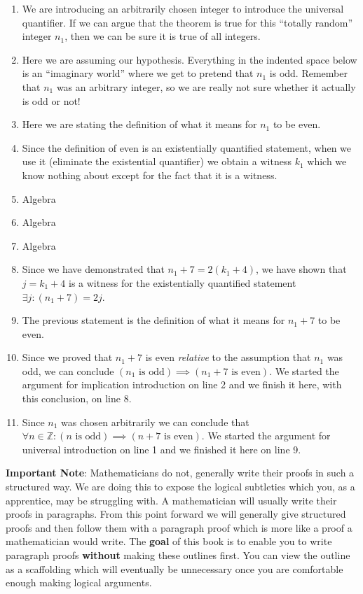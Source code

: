 \begin{example}
	\begin{enumerate}
		\item We are introducing an arbitrarily chosen integer to introduce the universal quantifier.  If we can argue that the theorem is true for this  ``totally random'' integer $n_1$, then we can be sure it is true of all integers.
		\item Here we are assuming our hypothesis.  Everything in the indented space below is an ``imaginary world'' where we get to pretend that $n_1$ is odd.  Remember that $n_1$ was an arbitrary integer, so we are really not sure whether it actually is odd or not!
		\item Here we are stating the definition of what it means for $n_1$ to be even.  \item Since the definition of even is an existentially quantified statement, when we use it (eliminate the existential quantifier) we obtain a witness $k_1$ which we know nothing about except for the fact that it is a witness.
		\item Algebra
		\item Algebra
		\item Algebra
		\item Since we have demonstrated that $n_1+7 = 2(k_1+4)$, we have shown that $j = k_1+4$ is a witness for the existentially quantified statement $\exists j : (n_1+7) = 2j $.  
		\item The previous statement is the definition of what it means for $n_1+7$ to be even.
		\item Since we proved that $n_1 + 7$ is even \textit{relative} to the assumption that $n_1$ was odd, we can conclude $(n_1 \textrm{ is odd}) \implies (n_1 + 7 \textrm{ is even})$.  We started the argument for implication introduction on line 2 and we finish it here, with this conclusion, on line 8.
		\item Since $n_1$ was chosen arbitrarily we can conclude that 	$\forall n \in \mathbb{Z}: (\textrm{$n$ is odd}) \implies (\textrm{$n+7$ is even})$.  We started the argument for universal introduction on line 1 and we finished it here on line 9.
	\end{enumerate}

\textbf{Important Note}:  Mathematicians do not, generally write their proofs in such a structured way.  We are doing this to expose the logical subtleties which you, as a apprentice, may be struggling with.  A mathematician will usually write their proofs in paragraphs.  From this point forward we will generally give structured proofs and then follow them with a paragraph proof which is more like a proof a mathematician would write.  The \textbf{goal} of this book is to enable you to write paragraph proofs \textbf{without} making these outlines first.  You can view the outline as a scaffolding which will eventually be unnecessary once you are comfortable enough making logical arguments.


\end{example}
